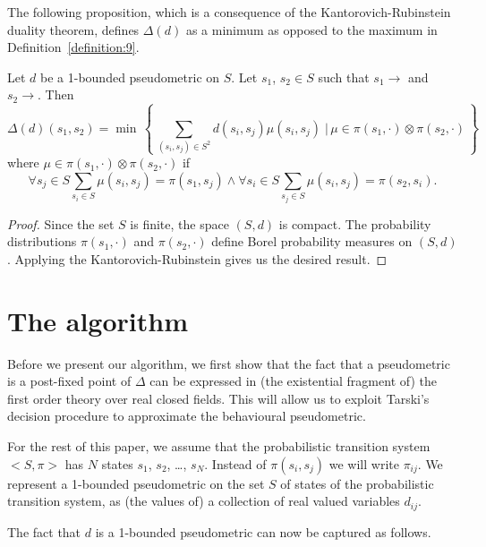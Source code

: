 \documentclass{LMCS}
\newcommand{\bigmid}{\; \bigg| \,}
\begin{document}
The following proposition, which is a consequence of the Kantorovich-Rubinstein 
duality theorem, defines $\Delta(d)$ as a minimum as opposed to the maximum in 
Definition~\ref{definition:9}.

\begin{prop}
\label{proposition:7}
Let $d$ be a 1-bounded pseudometric on $S$.  Let $s_1$, $s_2 \in S$
such that $s_1 \rightarrow$ and $s_2 \rightarrow$.  Then
\begin{displaymath}
\Delta(d)(s_1, s_2) 
=
\min\, \left \{\, \sum_{(s_i, s_j) \in S^2} d(s_i, s_j) \mu(s_i, s_j) \bigmid
\mu \in \pi(s_1, \cdot) \otimes \pi(s_2, \cdot) \, \right \}
\end{displaymath}
where $\mu \in \pi(s_1, \cdot) \otimes \pi(s_2, \cdot)$ if
\begin{displaymath}
\forall s_j \in S \sum_{s_i \in S} \mu(s_i, s_j) = \pi(s_1, s_j) \wedge
\forall s_i \in S \sum_{s_j \in S} \mu(s_i, s_j) = \pi(s_2, s_i).
\end{displaymath}
\end{prop}
\begin{proof}
Since the set $S$ is finite, the space $(S, d)$ is compact.  The probability
distributions $\pi(s_1, \cdot)$ and $\pi(s_2, \cdot)$ define Borel
probability measures on $(S, d)$.  Applying the Kantorovich-Rubinstein
gives us the desired result.
\end{proof}

\section{The algorithm}
\label{section:6}

Before we present our algorithm, we first show that the fact that a pseudometric
is a post-fixed point of $\Delta$ can be expressed in (the existential 
fragment of) the first order theory over real closed fields.
This will allow us to exploit Tarski's decision procedure to
approximate the behavioural pseudometric.  

For the rest of this paper, we assume that the probabilistic transition system $<S, \pi>$
has $N$ states $s_1$, $s_2$, \ldots, $s_N$.  Instead of $\pi(s_i, s_j)$ 
we will write $\pi_{ij}$.  We represent a 1-bounded
pseudometric on the set $S$ of states of the probabilistic transition
system, as (the values of) a collection of real valued variables $d_{ij}$. 

The fact that $d$ is a 1-bounded pseudometric can now be captured as follows.
\end{document}
